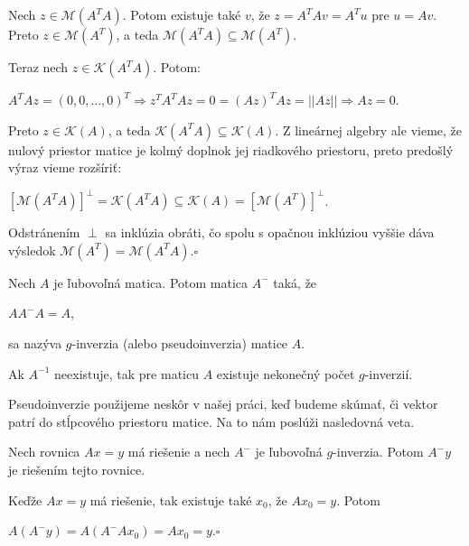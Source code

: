 \begin{dokaz}
Nech $z \in \mathcal{M}(A^T A)$. Potom existuje také $v$, že $z = A^T A v = A^T u$ pre $u = A v$.
Preto $z \in \mathcal{M}(A^T)$, a teda $\mathcal{M}(A^T A) \subseteq \mathcal{M}(A^T)$.

Teraz nech $z \in \mathcal{K}(A^T A)$. Potom:

\begin{center}
$
A^T A z = (0, 0, \ldots, 0)^T \Rightarrow z^T A^T A z = 0 = (Az)^T Az = ||Az|| \Rightarrow Az = 0
$.
\end{center}

Preto $z \in \mathcal{K}(A)$, a teda $\mathcal{K}(A^T A) \subseteq \mathcal{K}(A)$.
Z lineárnej algebry ale vieme, že nulový priestor matice je kolmý doplnok jej riadkového priestoru,
preto predošlý výraz vieme rozšíriť:
\begin{center}
$
[\mathcal{M}(A^T A)]^{\perp} = \mathcal{K}(A^T A) \subseteq \mathcal{K}(A) = [\mathcal{M}(A^T)]^{\perp}
$.
\end{center}

Odstránením $\perp$ sa inklúzia obráti, čo spolu s opačnou inklúziou vyššie dáva výsledok $\mathcal{M}(A^T) = \mathcal{M}(A^T A)$.$\square$
\end{dokaz}

\begin{defin}
Nech $A$ je ľubovoľná matica. Potom matica $A^-$ taká, že
\begin{center}
$A A^- A = A$,
\end{center}
sa nazýva $g$-inverzia (alebo pseudoinverzia) matice $A$.
\end{defin}

\begin{com}
Ak $A^{-1}$ neexistuje, tak pre maticu $A$ existuje nekonečný počet $g$-inverzií.
\end{com}

Pseudoinverzie použijeme neskôr v našej práci, keď budeme skúmať, 
či vektor patrí do stĺpcového priestoru matice. Na to nám poslúži nasledovná veta.

\begin{theorem}
\label{veta3}
Nech rovnica $Ax = y$ má riešenie a nech $A^-$ je ľubovoľná $g$-inverzia. Potom $A^- y$ je riešením tejto rovnice.
\end{theorem}

\begin{dokaz}
Keďže $Ax = y$ má riešenie, tak existuje také $x_0$, že $A x_0 = y$. Potom 
\begin{center}
$A (A^- y) = A(A^- A x_0) = A x_0 = y$.$\square$
\end{center}
\end{dokaz}

